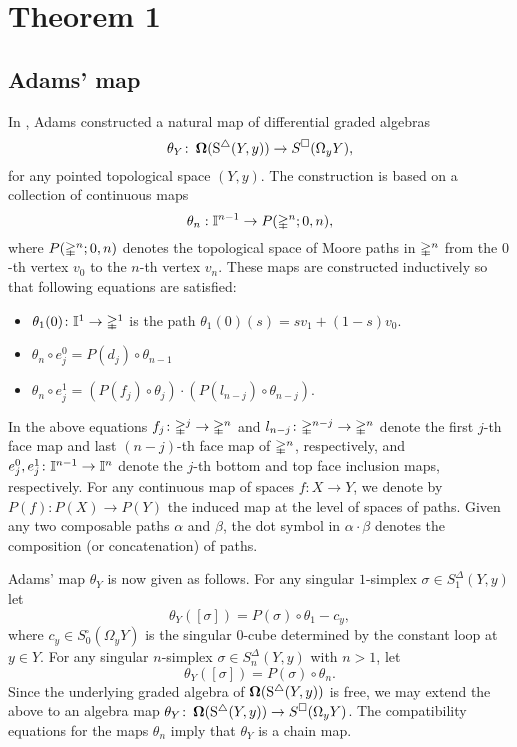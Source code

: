 \section{Theorem 1}

\subsection{Adams' map}

In \cite{adams1956cobar}, Adams constructed a natural map of differential graded algebras \begin{equation} \label{e:adams map}
\theta_Y \colon \operatorname{\mathbf{\Omega}}(\operatorname{S^{\triangle}}(Y, y)) \to S^{\square}(\Omega_y Y),
\end{equation}
for any pointed topological space $(Y,y)$. The construction is based on a collection of continuous maps $$\theta_n: \mathbb{I}^{n-1} \to P(\mathbb{\Delta}^n;0,n),$$
where $P(\mathbb{\Delta}^n;0,n)$ denotes the topological space of Moore paths in $\mathbb{\Delta}^n$ from the $0$-th vertex $v_0$ to the $n$-th vertex $v_n$. These maps are constructed inductively so that following equations are satisfied:
\begin{itemize}
\item $\theta_1(0)\colon \mathbb{I}^1 \to \mathbb{\Delta}^1$ is the path $\theta_1(0)(s)=sv_1 +(1-s)v_0$.
\item
 $\theta_n \circ e_j^0=P(d_j) \circ \theta_{n-1}$
\item
 $\theta_n \circ e_j^1=(P(f_j) \circ \theta_j) \cdot (P(l_{n-j}) \circ \theta_{n-j})$.
\end{itemize}
In the above equations $f_j\colon \mathbb{\Delta}^j \rightarrow \mathbb{\Delta}^n$ and $l_{n-j}\colon \mathbb{\Delta}^{n-j} \rightarrow \mathbb{\Delta}^n$ denote the first $j$-th face map and last $(n-j)$-th face map of $\mathbb{\Delta}^n$, respectively, and
$e_j^0,e_j^1\colon \mathbb{I}^{n-1} \rightarrow \mathbb{I}^{n}$ denote the $j$-th bottom and top face inclusion maps, respectively. For any continuous map of spaces $f\colon X \to Y$, we denote by $P(f)\colon P(X) \to P(Y)$ the induced map at the level of spaces of paths. Given any two composable paths $\alpha$ and $\beta$, the dot symbol in $\alpha \cdot \beta$ denotes the composition (or concatenation) of paths.

Adams' map $\theta_Y$ is now given as follows. For any singular $1$-simplex $\sigma \in S^{\Delta}_1(Y, y)$ let
$$\theta_Y([\sigma])= P(\sigma) \circ \theta_1 - c_y,$$
where $c_y \in S^{\square}_0(\Omega_y Y)$ is the singular $0$-cube determined by the constant loop at $y \in Y.$ For any singular $n$-simplex $\sigma \in S^{\Delta}_n(Y, y)$ with $n>1$, let
$$\theta_Y([\sigma])= P(\sigma) \circ \theta_n.$$ Since the underlying graded algebra of $\operatorname{\mathbf{\Omega}}(\operatorname{S^{\triangle}}(Y, y))$ is free, we may extend the above to an algebra map $\theta_Y \colon \operatorname{\mathbf{\Omega}}(\operatorname{S^{\triangle}}(Y, y)) \to S^{\square}(\Omega_y Y)$. The compatibility equations for the maps $\theta_n$ imply that $\theta_Y$ is a chain map. 

